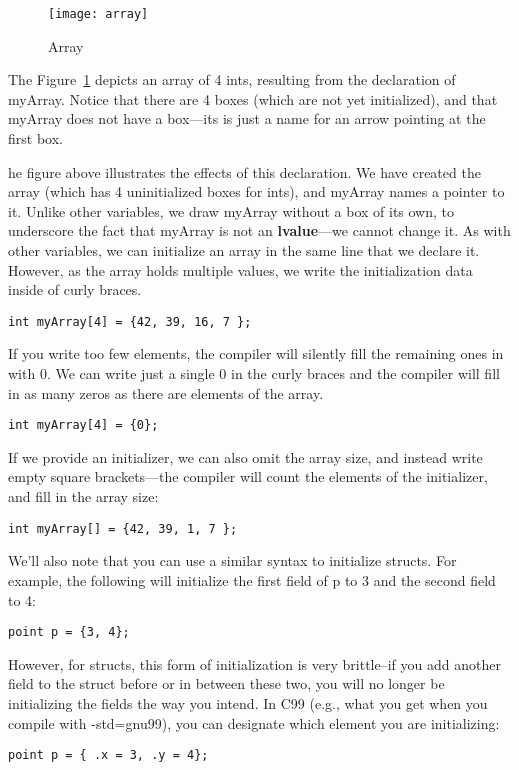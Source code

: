 \documentclass[11pt, a4paper]{article}
\begin{document}
\begin{figure}[htpb]
  \centering
  \texttt{[image: array]}
  \caption{Array}
  \label{fig:array}
\end{figure}


The Figure~\ref{fig:array} depicts an array of 4 ints, resulting from the declaration of myArray. Notice that there are 4 boxes (which are not yet initialized), and that myArray does not have a box—its is just a name for an arrow pointing at the first box.


he figure above illustrates the effects of this declaration. We have created the array (which has 4 uninitialized boxes for ints), and myArray names a pointer to it. Unlike other variables, we draw myArray without a box of its own, to underscore the fact that myArray is not an \textbf{lvalue}—we cannot change it. As with other variables, we can initialize an array in the same line that we declare it. However, as the array holds multiple values, we write the initialization data inside of curly braces. 


\texttt{int myArray[4] = \{42, 39, 16, 7 \};} 

If you write too few elements, the compiler will silently fill the remaining ones in with 0. We can write just a single 0 in the curly braces and the compiler will fill in as many zeros as there are elements of the array. 


\texttt{int myArray[4] = \{0\};} 



If we provide an initializer, we can also omit the array size, and instead write empty square brackets—the compiler will count the elements of the initializer, and fill in the array size:

\texttt{int myArray[] = \{42, 39, 1, 7 \};} 


We’ll also note that you can use a similar syntax to initialize structs. For example, the following will initialize the first field of p to 3 and the second field to 4:

\texttt{point p = \{3, 4\};} 



However, for structs, this form of initialization is very brittle–if you add another field to the struct before or in between these two, you will no longer be initializing the fields the way you intend. In C99 (e.g., what you get when you compile with -std=gnu99), you can designate which element you are initializing:


\texttt{point p = \{ .x = 3, .y = 4\};} 
\end{document}
